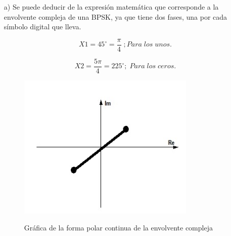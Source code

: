  \begin{itemize}
 \item[a)]Se puede deducir de la expresión matemática que corresponde a la envolvente compleja de una BPSK, ya que tiene dos fases, una por cada símbolo digital que lleva.


 \begin{equation} \label{capdos_veinticinco}
 X1=45^{\circ}=\frac{\pi }{4} \; ; Para\; los\; unos.
 \end{equation}
 
 \begin{equation} \label{capdos_veintiseis}
 X2= \frac{5\pi }{4}=225^{\circ}; \;	Para\; los\; ceros.
 \end{equation}

\begin{figure}[h!]
	\captionsetup{justification = raggedright, singlelinecheck = false}
	\caption{Gráfica de la forma polar continua de la envolvente compleja}
		\centering
    \includegraphics[width=0.8\textwidth]{Imagenes/polarcont.png}
    \label{fig:polarcont}
\end{figure}


\end{itemize}

